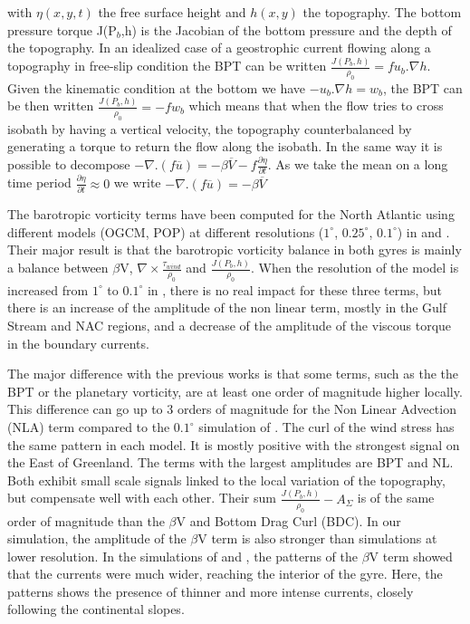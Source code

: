 \documentclass{ametsoc}
\begin{document}
with $\eta(x,y,t)$ the free surface height and $h(x,y)$ the topography. The bottom pressure torque J(P$_b$,h) is the Jacobian of the bottom pressure and the depth of the topography. In an idealized case of a geostrophic current flowing along a topography in free-slip condition the BPT can be written $\frac{J(P_b,h)}{\rho _0}=f u_b.\nabla h$. Given the kinematic condition at the bottom we have $-u_b . \nabla h =w_b$, the BPT can be then written $\frac{J(P_b,h)}{\rho _0}=-fw_b$ which means that when the flow tries to cross isobath by having a vertical velocity, the topography counterbalanced by generating a torque to return the flow along the isobath. In the same way it is possible to decompose $-\nabla.(f\overline{u})=-\beta \overline{V}-f \frac{\partial \eta}{\partial t}$. As we take the mean on a long time period $\frac{\partial \eta}{\partial t} \approx 0$ we write  $-\nabla.(f\overline{u})= - \beta \overline{V}$

The barotropic vorticity terms have been computed for the North Atlantic using different models (OGCM, POP) at different resolutions ($1^{\circ}$, $0.25^{\circ}$, $0.1^{\circ}$) in \citet{hughes2001} and \citet{yeager2015} . Their major result is that the barotropic vorticity balance in both gyres is mainly a balance between $\beta$V, $\nabla \times \frac{\tau _{wind}}{\rho_{0}}$ and $\frac{J(P_b,h)}{\rho _0}$. When the resolution of the model is increased from $1^{\circ}$ to $0.1^{\circ}$ in \citet{yeager2015}, there is no real impact for these three terms, but there is an increase of the amplitude of the non linear term, mostly in the Gulf Stream and NAC regions, and a decrease of the amplitude of the viscous torque in the boundary currents.

The major difference with the previous works is that some terms, such as the the BPT or the planetary vorticity, are at least one order of magnitude higher locally. This difference can go up to 3 orders of magnitude for the Non Linear Advection (NLA) term compared to the $0.1^{\circ}$ simulation of \citet{yeager2015}. The curl of the wind stress has the same pattern in each model. It is mostly positive with the strongest signal on the East of Greenland. The terms with the largest amplitudes are BPT and NL. Both exhibit small scale signals linked to the local variation of the topography, but compensate well with each other. Their sum $\frac{J(P_b,h)}{\rho _0}-A_{\Sigma}$ is of the same order of magnitude than the $\beta$V and Bottom Drag Curl (BDC). In our simulation, the amplitude of the $\beta$V term is also stronger than simulations at lower resolution. In the simulations of  \citet{hughes2001} and \citet{yeager2015}, the patterns of the $\beta$V term showed that the currents were much wider, reaching the interior of the gyre. Here, the patterns shows the presence of thinner and more intense currents, closely following the continental slopes.
\end{document}
